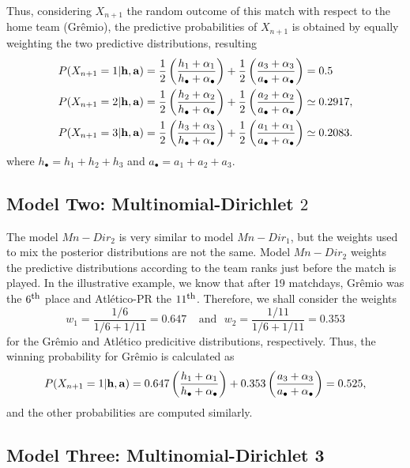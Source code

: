 \documentclass[journal,article,accept,moreauthors,pdftex,12pt,a4paper]{mdpi}
\begin{document}
	Thus, considering $X_{n + 1}$ the random outcome of this match with
	respect to the home team (Gr\^{e}mio), the predictive probabilities
	of $X_{n + 1}$ is obtained by equally weighting the two predictive
	distributions, resulting
	\begin{align*}
		P(X_{n+1}=1|{\bf h}, {\bf a}) &=
		\frac{1}{2}\left(\frac{h_1+\alpha_1}{h_{\bullet}+\alpha_{\bullet}}\right)+\frac{1}{2}\left(\frac{a_3+\alpha_3}{a_{\bullet}+\alpha_{\bullet}}\right)=0.5
		\\
		P(X_{n+1}=2|{\bf h}, {\bf a}) &=
		\frac{1}{2}\left(\frac{h_2+\alpha_2}{h_{\bullet}+\alpha_{\bullet}}\right)+\frac{1}{2}\left(\frac{a_2+\alpha_2}{a_{\bullet}+\alpha_{\bullet}}\right)\simeq0.2917, \\
		P(X_{n+1}=3|{\bf h}, {\bf a}) &= \frac{1}{2}
		\left(\frac{h_3+\alpha_3}{h_{\bullet}+\alpha_{\bullet}}\right)+\frac{1}{2}\left(\frac{a_1+\alpha_1}{a_{\bullet}+\alpha_{\bullet}}\right)\simeq0.2083.
	\end{align*}
	\noindent where $h_{\bullet}=h_1+h_2+h_3$ and $a_{\bullet}=a_1+a_2+a_3$.
	
	\subsection{Model Two: Multinomial-Dirichlet $2$}
	\label{sec::Mn_Dir2}
	
	The model $Mn-Dir_2$ is very similar to model $Mn-Dir_1$, but the
	weights used to mix the posterior distributions are not the same.
	Model $Mn-Dir_2$ weights the predictive distributions according to
	the team ranks just before the match is played. In the illustrative
	example, we know that after 19 matchdays, Gr\^emio was the $6^{\footnotesize\mbox{th}}$
	place and Atl\'etico-PR the $11^{\footnotesize\mbox{th}}$. Therefore, we shall consider
	the weights
	\[w_1 = \frac{1/6}{1/6+1/11}=0.647 ~ ~ ~ ~ ~\text{and} ~ ~ ~ w_2 = \frac{1/11}{1/6+1/11}=0.353\]
	\noindent for the Gr\^emio and Atl\'etico predicitive distributions,
	respectively. Thus, the winning probability for Gr\^emio is
	calculated as
	\[P(X_{n+1}= 1|{\bf h}, {\bf a})=0.647\left(\frac{h_1+\alpha_1}{h_{\bullet}+\alpha_{\bullet}}\right)+0.353\left(\frac{a_3+\alpha_3}{a_{\bullet}+\alpha_{\bullet}}\right)=0.525,\]
	\noindent and the other probabilities are computed similarly.
	
	\subsection{Model Three: Multinomial-Dirichlet 3}
	\label{sec::Mn_Dir3}
	
\end{document}
